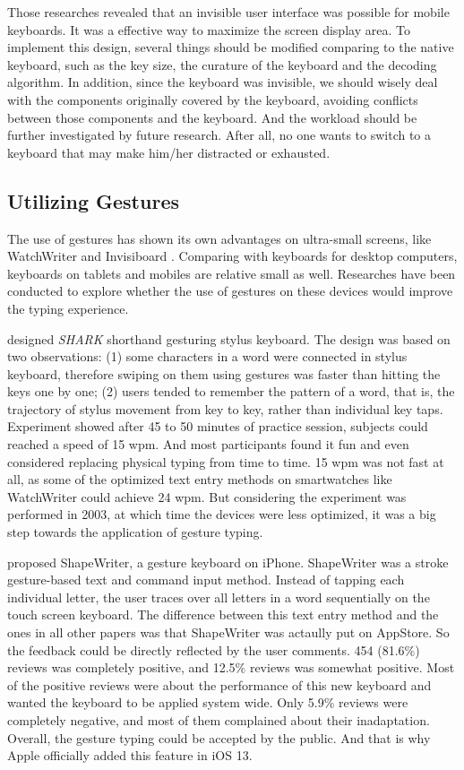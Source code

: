 \documentclass[11pt]{article}
\begin{document}
Those researches revealed that an invisible user interface was possible for mobile keyboards. It was a effective way to maximize the screen display area. To implement this design, several things should be modified comparing to the native keyboard, such as the key size, the curature of the keyboard and the decoding algorithm. In addition, since the keyboard was invisible, we should wisely deal with the components originally covered by the keyboard, avoiding conflicts between those components and the keyboard. And the workload should be further investigated by future research. After all, no one wants to switch to a keyboard that may make him/her distracted or exhausted.

\subsection{Utilizing Gestures}
The use of gestures has shown its own advantages on ultra-small screens, like WatchWriter \citep{10.1145/2858036.2858242} and Invisiboard \citep{10.1145/2935334.2935360}. Comparing with keyboards for desktop computers, keyboards on tablets and mobiles are relative small as well. Researches have been conducted to explore whether the use of gestures on these devices would improve the typing experience.

\citet{10.1145/642611.642630} designed \textit{SHARK} shorthand gesturing stylus keyboard. The design was based on two observations: (1) some characters in a word were connected in stylus keyboard, therefore swiping on them using gestures was faster than hitting the keys one by one; (2) users tended to remember the pattern of a word, that is, the trajectory of stylus movement from key to key, rather than individual key taps. Experiment showed after 45 to 50 minutes of practice session, subjects could reached a speed of 15 wpm. And most participants found it fun and even considered replacing physical typing from time to time. 15 wpm was not fast at all, as some of the optimized text entry methods on smartwatches like WatchWriter \citep{10.1145/2858036.2858242} could achieve 24 wpm. But considering the experiment was performed in 2003, at which time the devices were less optimized, it was a big step towards the application of gesture typing.

\citet{10.1145/1520340.1520380} proposed ShapeWriter, a gesture keyboard on iPhone. ShapeWriter was a stroke gesture-based text and command input method. Instead of tapping each individual letter, the user traces over all letters in a word sequentially on the touch screen keyboard. The difference between this text entry method and the ones in all other papers was that ShapeWriter was actaully put on AppStore. So the feedback could be directly reflected by the user comments. 454 (81.6\%) reviews was completely positive, and 12.5\% reviews was somewhat positive. Most of the positive reviews were about the performance of this new keyboard and wanted the keyboard to be applied system wide. Only 5.9\% reviews were completely negative, and most of them complained about their inadaptation. Overall, the gesture typing could be accepted by the public. And that is why Apple officially added this feature in iOS 13.
\end{document}
